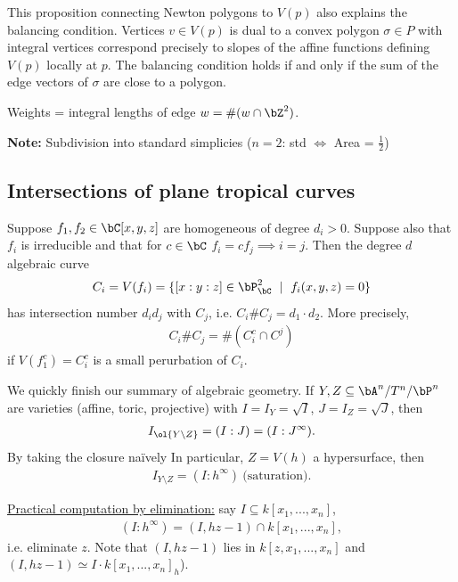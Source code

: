 This proposition connecting Newton polygons to $V(p)$ also explains the balancing condition. Vertices $v \in V(p)$ is dual to a convex polygon $\sigma \in P$ with integral vertices correspond precisely to slopes of the affine functions defining $V(p)$ locally at $p$. The balancing condition holds if and only if the sum of the edge vectors of $\sigma$ are close to a polygon.

Weights = integral lengths of edge $w = \#(w \cap \bZ^2)$.

\textbf{Note:} Subdivision into standard simplicies ($n = 2$: std $\iff $ Area = $\frac{1}{2}$)

\subsection{Intersections of plane tropical curves}

\begin{thm}\label{thm:bezout-thm}
  Suppose $f_1,f_2 \in \bC[x,y,z]$ are homogeneous of degree $d_i > 0$. Suppose also that $f_i$ is irreducible and that for $c \in \bC$ $f_i = cf_j \implies i = j$. Then the degree $d$ algebraic curve
  \begin{align*}
    C_i = V(f_i) = \{[x:y:z] \in \bP^2_\bC ~\mid~ f_i(x,y,z) = 0\}
  \end{align*}
  has intersection number $d_id_j$ with $C_j$, i.e. $C_i \# C_j = d_1\cdot d_2$. More precisely, \begin{align*}
    C_i\# C_j = \#(C_i^c \cap C^j)
  \end{align*}
  if $V(f_1^c) = C_i^c$ is a small perurbation of $C_i$.
\end{thm}

\bigskip

 We quickly finish our summary of algebraic geometry. If $Y,Z \subseteq \bA^n / T^n / \bP^n$ are varieties (affine, toric, projective) with $I = I_Y = \sqrt{I}$, $J = I_Z = \sqrt{J}$, then
\begin{align*}
  I_{\ol{Y \setminus Z}} = (I : J) = (I : J^{\infty}).
\end{align*}
By taking the closure na\" ively
In particular, $Z = V(h)$ a hypersurface, then
\begin{align*}
  I_{Y\setminus Z} = (I: h^\infty) ~ \text{(saturation)}.
\end{align*}

\bigskip

\ul{Practical computation by elimination:} say $I \subseteq k[x_1,...,x_n]$,
\begin{align*}
  (I : h^\infty) = (I, hz - 1) \cap k[x_1,...,x_n],
\end{align*}
i.e. eliminate $z$. Note that $(I, hz - 1)$ lies in $k[z,x_1,...,x_n]$ and $(I, hz-1) \simeq I\cdot k[x_1,...,x_n]_h$).

